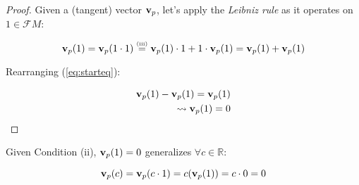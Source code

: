 \documentclass{article}
\begin{document}
\begin{proof}[Proof]

    Given a (tangent) vector \(\vb v_p\), let's apply the \textit{Leibniz rule} as it operates on \(1 \in \mathcal{F}M\):

\begin{equation}
    \vb v_p(1) = \vb v_p(1 \cdot 1) \overset{\text{\tiny{(iii)}}}{=} \vb v_p(1) \cdot 1 + 1 \cdot \vb v_p(1) = \vb v_p(1) + \vb v_p(1)
    \label{eq:starteq}
\end{equation}

\noindent
Rearranging (\ref{eq:starteq}):

\begin{align*}
    \vb v_p(1) - \vb v_p(1) = \vb v_p(1) \\
    \leadsto \vb v_p(1) = 0
\end{align*}

\end{proof}

\noindent
Given Condition (ii), \(\vb v_p(1) = 0\) generalizes \(\forall c \in \mathbb{R}\):

\begin{equation*}
    \vb v_p(c) = \vb v_p(c \cdot 1) = c(\vb v_p(1)) = c \cdot 0 = 0
\end{equation*}

%
%
%
%
%
%
%
%
%
%
%
%
%
\end{document}
